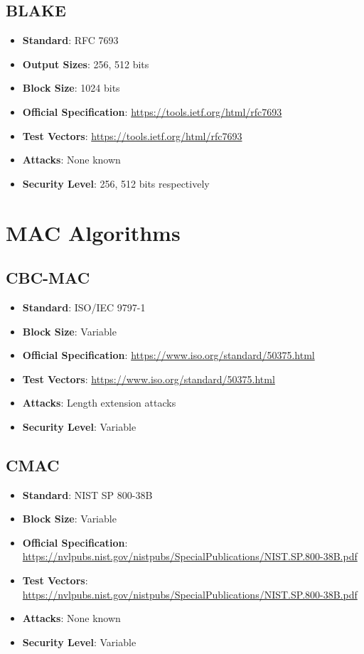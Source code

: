 \documentclass[11pt,a4paper]{article}
\begin{document}
\subsection{BLAKE}
\begin{itemize}
    \item \textbf{Standard}: RFC 7693
    \item \textbf{Output Sizes}: 256, 512 bits
    \item \textbf{Block Size}: 1024 bits
    \item \textbf{Official Specification}: \url{https://tools.ietf.org/html/rfc7693}
    \item \textbf{Test Vectors}: \url{https://tools.ietf.org/html/rfc7693}
    \item \textbf{Attacks}: None known
    \item \textbf{Security Level}: 256, 512 bits respectively
\end{itemize}

\section{MAC Algorithms}

\subsection{CBC-MAC}
\begin{itemize}
    \item \textbf{Standard}: ISO/IEC 9797-1
    \item \textbf{Block Size}: Variable
    \item \textbf{Official Specification}: \url{https://www.iso.org/standard/50375.html}
    \item \textbf{Test Vectors}: \url{https://www.iso.org/standard/50375.html}
    \item \textbf{Attacks}: Length extension attacks
    \item \textbf{Security Level}: Variable
\end{itemize}

\subsection{CMAC}
\begin{itemize}
    \item \textbf{Standard}: NIST SP 800-38B
    \item \textbf{Block Size}: Variable
    \item \textbf{Official Specification}: \url{https://nvlpubs.nist.gov/nistpubs/SpecialPublications/NIST.SP.800-38B.pdf}
    \item \textbf{Test Vectors}: \url{https://nvlpubs.nist.gov/nistpubs/SpecialPublications/NIST.SP.800-38B.pdf}
    \item \textbf{Attacks}: None known
    \item \textbf{Security Level}: Variable
\end{itemize}
\end{document}
